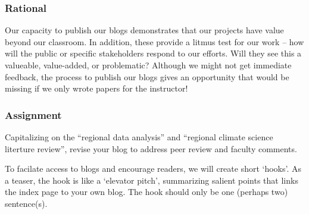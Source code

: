 
\subsubsection{Rational}

Our capacity to publish our blogs demonstrates that our projects have value beyond our classroom. In addition, these provide a litmus test for our work -- how will the public or specific stakeholders respond to our efforts. Will they see this a valueable, value-added, or problematic?  Although we might not get immediate feedback, the process to publish our blogs gives an opportunity that would be missing if we only wrote papers for the instructor!

\subsubsection{Assignment}

Capitalizing on the ``regional data analysis'' and ``regional climate science literture review'', revise your blog to address peer review and faculty comments.

To facilate access to blogs and encourage readers, we will create short `hooks'. As a teaser, the hook is like a `elevator pitch', summarizing salient points that links the index page to your own blog. The hook should only be one (perhaps two) sentence(s). 


